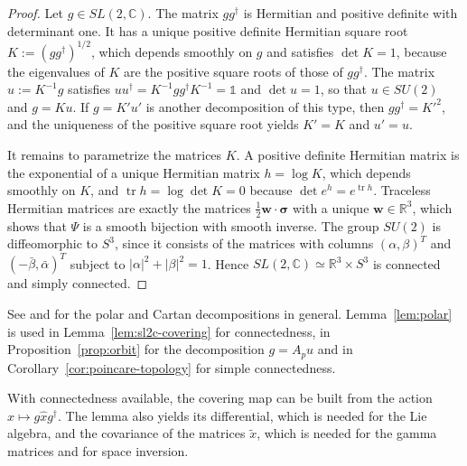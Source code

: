 \begin{proof}
	Let $g\in SL(2,\mathbb{C})$. The matrix $gg^\dagger$ is Hermitian and positive definite with determinant one. It has a unique positive definite Hermitian square root $K:=(gg^\dagger)^{1/2}$, which depends smoothly on $g$ and satisfies $\det K=1$, because the eigenvalues of $K$ are the positive square roots of those of $gg^\dagger$. The matrix $u:=K^{-1}g$ satisfies $uu^\dagger=K^{-1}gg^\dagger K^{-1}=\mathbb{1}$ and $\det u=1$, so that $u\in SU(2)$ and $g=Ku$. If $g=K'u'$ is another decomposition of this type, then $gg^\dagger=K'^2$, and the uniqueness of the positive square root yields $K'=K$ and $u'=u$.
	
	It remains to parametrize the matrices $K$. A positive definite Hermitian matrix is the exponential of a unique Hermitian matrix $h=\log K$, which depends smoothly on $K$, and $\operatorname{tr}h=\log\det K=0$ because $\det e^h=e^{\operatorname{tr}h}$. Traceless Hermitian matrices are exactly the matrices $\tfrac12\mathbf{w}\cdot\boldsymbol{\sigma}$ with a unique $\mathbf{w}\in\mathbb{R}^3$, which shows that $\Psi$ is a smooth bijection with smooth inverse. The group $SU(2)$ is diffeomorphic to $S^3$, since it consists of the matrices with columns $(\alpha,\beta)^T$ and $(-\bar\beta,\bar\alpha)^T$ subject to $|\alpha|^2+|\beta|^2=1$. Hence $SL(2,\mathbb{C})\simeq\mathbb{R}^3\times S^3$ is connected and simply connected.
\end{proof}

\noindent See \cite[TODO-location]{TODO-Hal03} and \cite[Chapter 3, \S6]{TODO-BarutRaczka} for the polar and Cartan decompositions in general. Lemma~\ref{lem:polar} is used in Lemma~\ref{lem:sl2c-covering} for connectedness, in Proposition~\ref{prop:orbit} for the decomposition $g=A_pu$ and in Corollary~\ref{cor:poincare-topology} for simple connectedness.

With connectedness available, the covering map can be built from the action $\hat{x}\mapsto g\hat{x}g^\dagger$. The lemma also yields its differential, which is needed for the Lie algebra, and the covariance of the matrices $\tilde{x}$, which is needed for the gamma matrices and for space inversion.

